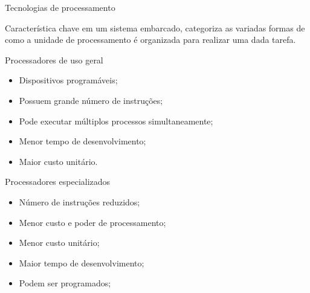 \begin{frame}{Tecnologias de processamento}

Característica chave em um sistema embarcado, categoriza as variadas formas de como a unidade de processamento é organizada para realizar uma dada tarefa. 

\end{frame}

\begin{frame}{Processadores de uso geral}

    \begin{itemize}
        \item Dispositivos programáveis;
        \item Possuem grande número de instruções;
        \item Pode executar múltiplos processos simultaneamente;
        \item Menor tempo de desenvolvimento;
        \item Maior custo unitário.
        
    \end{itemize}

\end{frame}

\begin{frame}{Processadores especializados}

    \begin{itemize}
        \item Número de instruções reduzidos;
        \item Menor custo e poder de processamento;
        \item Menor custo unitário; 
        \item Maior tempo de desenvolvimento;
        \item Podem ser programados;
    \end{itemize}

    
\end{frame}



